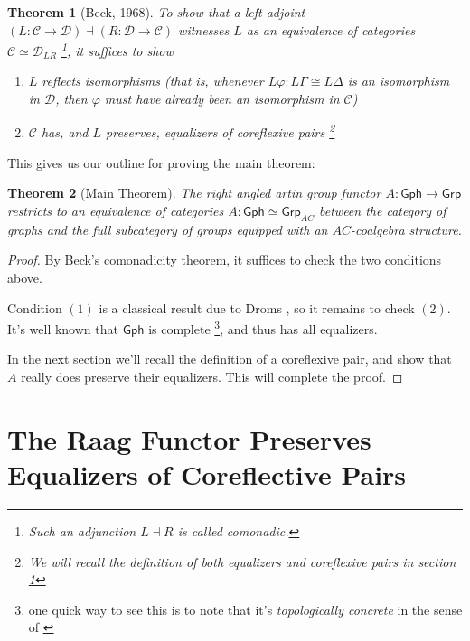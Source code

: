 \documentclass[12pt]{article}
\newtheorem*{thm*}{Theorem}
\theoremstyle{definition}
\theoremstyle{theorem}
\newcommand*{\catFont}[1]{\mathsf{#1}}
\newcommand*{\catVarFont}[1]{\mathcal{#1}}
\newcommand{\Grp}{\catFont{Grp}}
\newcommand{\catC}{\catVarFont{C}}
\newcommand{\catD}{\catVarFont{D}}
\newcommand{\Gph}{\mathsf{Gph}}
\begin{document}
\begin{thm*}[Beck, 1968]
  To show that a left adjoint
  $(L : \catC \to \catD) \dashv (R : \catD \to \catC)$ 
  witnesses $L$ as an equivalence of categories $\catC \simeq \catD_{LR}$%
  \footnote{Such an adjunction $L \dashv R$ is called \emph{comonadic}.},
  it suffices to show

  \begin{enumerate}
      \item $L$ reflects isomorphisms (that is, whenever 
        $L \varphi : L\Gamma \cong L\Delta$ is an isomorphism in $\catD$, 
        then $\varphi$ must have already been an isomorphism in $\catC$)
      \item $\catC$ has, and $L$ preserves, equalizers of coreflexive pairs%
        \footnote{We will recall the definition of both equalizers and 
        coreflexive pairs in section \ref{proof}}
  \end{enumerate}
\end{thm*}

This gives us our outline for proving the main theorem:

\begin{thm*}[Main Theorem]
  The right angled artin group functor $A : \Gph \to \Grp$ restricts to 
  an equivalence of categories $A : \Gph \simeq \Grp_{AC}$ between the 
  category of graphs and the full subcategory of groups equipped with an 
  $AC$-coalgebra structure.
\end{thm*}

\begin{proof}
  By Beck's comonadicity theorem, it suffices to check the two conditions 
  above.

  Condition $(1)$ is a classical result due to Droms 
  \cite{dromsIsomorphismsGraphGroups1987}, 
  so it remains to check $(2)$. It's well known that $\mathsf{Gph}$
  is complete%
  \footnote{one quick way to see this is to note that it's \emph{topologically concrete}
  in the sense of \cite{adamekAbstractConcreteCategories2009}}, and thus has all equalizers. 

  In the next section we'll recall the definition of a coreflexive pair, 
  and show that $A$ really does preserve their equalizers. This will 
  complete the proof.
\end{proof}

\section{The Raag Functor Preserves Equalizers of Coreflective Pairs}
\label{proof}
\end{document}
